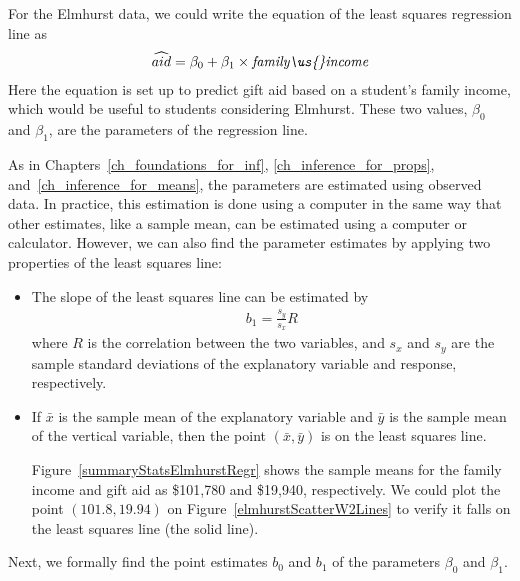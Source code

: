 For the Elmhurst data, we could write the equation of the least squares regression line as
\begin{eqnarray*}
\widehat{aid} = \beta_0 + \beta_{1}\times
    \textit{family\us{}income}
\end{eqnarray*}
Here the equation is set up to predict gift aid based on a student's family income, which would be useful to students considering Elmhurst. These two values, $\beta_0$ and $\beta_1$, are the parameters of the regression line.

As in
Chapters~\ref{ch_foundations_for_inf},
\ref{ch_inference_for_props},
and~\ref{ch_inference_for_means},
the parameters are estimated using observed data. In practice, this estimation is done using a computer in the same way that other estimates, like a sample mean, can be estimated using a computer or calculator. However, we can also find the parameter estimates by applying two properties of the least squares line:
\begin{itemize}
\item
    The slope of the least squares line can be estimated by
    \begin{align*}
    b_1 = \frac{s_y}{s_x} R
    \end{align*}
    where $R$ is the correlation between the two variables,
    and $s_x$ and $s_y$ are the sample standard deviations
    of the explanatory variable and response, respectively.
\item
    If $\bar{x}$ is the sample mean of the explanatory variable
    and $\bar{y}$ is the sample mean of the vertical variable,
    then the point $(\bar{x}, \bar{y})$ is on the least squares
    line.

    Figure~\ref{summaryStatsElmhurstRegr} shows the sample means
    for the family income and gift aid as \$101,780 and \$19,940,
    respectively.
    We could plot the point $(101.8, 19.94)$ on
    Figure~\vref{elmhurstScatterW2Lines}
    to verify it falls on the least squares line (the solid line).
\end{itemize}
Next, we formally find the point estimates $b_0$ and $b_1$
of the parameters $\beta_0$ and $\beta_1$.


